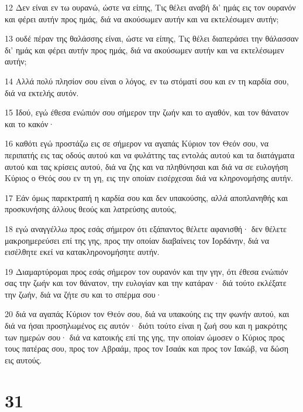 \par 12 Δεν είναι εν τω ουρανώ, ώστε να είπης, Τις θέλει αναβή δι' ημάς εις τον ουρανόν και φέρει αυτήν προς ημάς, διά να ακούσωμεν αυτήν και να εκτελέσωμεν αυτήν;
\par 13 ουδέ πέραν της θαλάσσης είναι, ώστε να είπης, Τις θέλει διαπεράσει την θάλασσαν δι' ημάς και φέρει αυτήν προς ημάς, διά να ακούσωμεν αυτήν και να εκτελέσωμεν αυτήν;
\par 14 Αλλά πολύ πλησίον σου είναι ο λόγος, εν τω στόματί σου και εν τη καρδία σου, διά να εκτελής αυτόν.
\par 15 Ιδού, εγώ έθεσα ενώπιόν σου σήμερον την ζωήν και το αγαθόν, και τον θάνατον και το κακόν·
\par 16 καθότι εγώ προστάζω εις σε σήμερον να αγαπάς Κύριον τον Θεόν σου, να περιπατής εις τας οδούς αυτού και να φυλάττης τας εντολάς αυτού και τα διατάγματα αυτού και τας κρίσεις αυτού, διά να ζης και να πληθύνησαι και διά να σε ευλογήση Κύριος ο Θεός σου εν τη γη, εις την οποίαν εισέρχεσαι διά να κληρονομήσης αυτήν.
\par 17 Εάν όμως παρεκτραπή η καρδία σου και δεν υπακούσης, αλλά αποπλανηθής και προσκυνήσης άλλους θεούς και λατρεύσης αυτούς,
\par 18 εγώ αναγγέλλω προς εσάς σήμερον ότι εξάπαντος θέλετε αφανισθή· δεν θέλετε μακροημερεύσει επί της γης, προς την οποίαν διαβαίνεις τον Ιορδάνην, διά να εισέλθητε εκεί να κατακληρονομήσητε αυτήν.
\par 19 Διαμαρτύρομαι προς εσάς σήμερον τον ουρανόν και την γην, ότι έθεσα ενώπιόν σας την ζωήν και τον θάνατον, την ευλογίαν και την κατάραν· διά τούτο εκλέξατε την ζωήν, διά να ζήτε συ και το σπέρμα σου·
\par 20 διά να αγαπάς Κύριον τον Θεόν σου, διά να υπακούης εις την φωνήν αυτού, και διά να ήσαι προσηλωμένος εις αυτόν· διότι τούτο είναι η ζωή σου και η μακρότης των ημερών σου· διά να κατοικής επί της γης, την οποίαν ώμοσεν ο Κύριος προς τους πατέρας σου, προς τον Αβραάμ, προς τον Ισαάκ και προς τον Ιακώβ, να δώση εις αυτούς.

\chapter{31}

